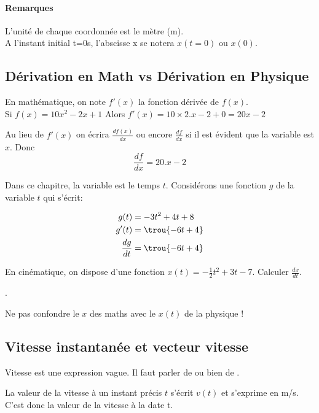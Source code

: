 \paragraph*{Remarques} L'unité de chaque coordonnée est le mètre (m). \\A l'instant initial t=0s, l'abscisse x se notera $x(t=0)$ ou $x(0)$.

\subsection{Dérivation en Math vs Dérivation en Physique}

En mathématique, on note $f'(x)$ la fonction dérivée de $f(x)$. 
\\ Si $f(x)= 10x^2 -2x + 1$ Alors $f'(x) = 10\times 2.x - 2 + 0 = 20x -2$ 
\\

Au lieu de $f'(x)$ on écrira $\frac{df(x)}{dx}$ ou encore $\frac{df}{dx}$ si il est évident que la variable est $x$.  Donc $$\frac{df}{dx} = 20.x -2$$


Dans ce chapitre, la variable est le temps $t$. Considérons une fonction $g$ de la variable $t$ qui s'écrit: 

\begin{align*}
	g(t) &= -3t^2 + 4t +8\\
	g'(t) &= \trou{- 6t + 4 }\\
	\frac{dg}{dt} &= \trou{-6t+4}
\end{align*}

En cinématique,  on dispose  d'une fonction $x(t) = -\frac{1}{2}t^2 + 3t -7$. Calculer $\frac{dx}{dt}$.

.



Ne pas confondre le $x$ des maths avec le $x(t)$ de la physique !
\newpage
\subsection{Vitesse instantanée et vecteur vitesse}

Vitesse est une expression vague. Il faut parler de  ou bien de .

La valeur de la vitesse à un instant précis $t$ s'écrit $v(t)$ et s'exprime en m/s. C'est donc la valeur de la vitesse à la date t.
\\


